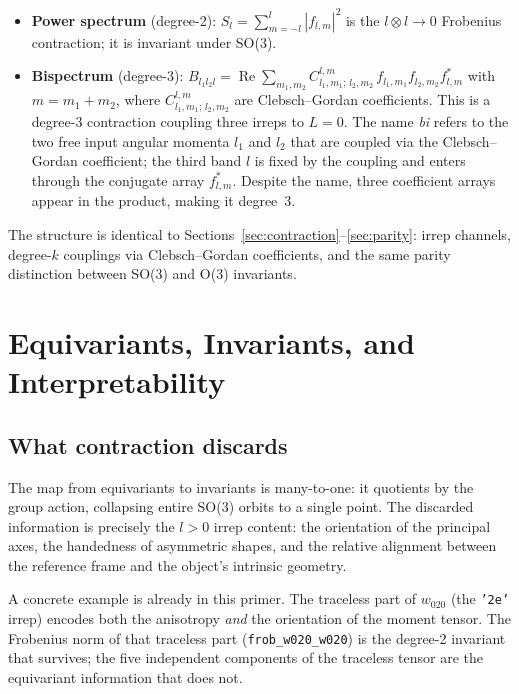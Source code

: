 \documentclass[11pt,a4paper]{article}
\begin{document}
\begin{itemize}
  \item \textbf{Power spectrum} (degree-2): $S_l = \sum_{m=-l}^{l} |f_{l,m}|^2$
        is the $l \otimes l \to 0$ Frobenius contraction; it is invariant under
        SO(3).
  \item \textbf{Bispectrum} (degree-3): $B_{l_1 l_2 l} =
        \operatorname{Re}\!\sum_{m_1, m_2} C^{l,m}_{l_1,m_1;\, l_2,m_2}\,
        f_{l_1,m_1} f_{l_2,m_2} f^*_{l,m}$ with $m = m_1 + m_2$, where
        $C^{l,m}_{l_1,m_1;\,l_2,m_2}$ are Clebsch--Gordan coefficients.
        This is a degree-3 contraction coupling three irreps to $L=0$.
        The name \emph{bi} refers to the two free input angular momenta $l_1$ and $l_2$ that are coupled via the Clebsch--Gordan coefficient; the third band $l$ is fixed by the coupling and enters through the conjugate array $f^*_{l,m}$.
        Despite the name, three coefficient arrays appear in the product, making it degree~3.
\end{itemize}

The structure is identical to Sections~\ref{sec:contraction}--\ref{sec:parity}:
irrep channels, degree-$k$ couplings via Clebsch--Gordan coefficients, and the
same parity distinction between SO(3) and O(3) invariants.

\section{Equivariants, Invariants, and Interpretability}
\label{sec:interp}

\subsection*{What contraction discards}

The map from equivariants to invariants is many-to-one:
it quotients by the group action, collapsing entire SO(3) orbits to a single point.
The discarded information is precisely the $l > 0$ irrep content:
the orientation of the principal axes, the handedness of asymmetric shapes,
and the relative alignment between the reference frame and the object's intrinsic geometry.

A concrete example is already in this primer.
The traceless part of $w_{020}$ (the \texttt{'2e'} irrep) encodes both the
anisotropy \emph{and} the orientation of the moment tensor.
The Frobenius norm of that traceless part (\texttt{frob\_w020\_w020}) is the
degree-2 invariant that survives; the five independent components of the
traceless tensor are the equivariant information that does not.
\end{document}
